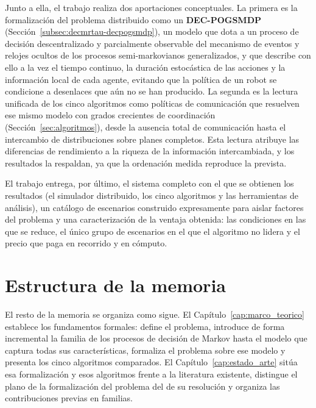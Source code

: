 Junto a ella, el trabajo realiza dos aportaciones conceptuales. La primera es la formalización del problema distribuido como un \textbf{DEC-POGSMDP} (Sección~\ref{subsec:decmrtau-decpogsmdp}), un modelo que dota a un proceso de decisión descentralizado y parcialmente observable del mecanismo de eventos y relojes ocultos de los procesos semi-markovianos generalizados, y que describe con ello a la vez el tiempo continuo, la duración estocástica de las acciones y la información local de cada agente, evitando que la política de un robot se condicione a desenlaces que aún no se han producido. La segunda es la lectura unificada de los cinco algoritmos como políticas de comunicación que resuelven ese mismo modelo con grados crecientes de coordinación (Sección~\ref{sec:algoritmos}), desde la ausencia total de comunicación hasta el intercambio de distribuciones sobre planes completos. Esta lectura atribuye las diferencias de rendimiento a la riqueza de la información intercambiada, y los resultados la respaldan, ya que la ordenación medida reproduce la prevista.

El trabajo entrega, por último, el sistema completo con el que se obtienen los resultados (el simulador distribuido, los cinco algoritmos y las herramientas de análisis), un catálogo de escenarios construido expresamente para aislar factores del problema y una caracterización de la ventaja obtenida: las condiciones en las que se reduce, el único grupo de escenarios en el que el algoritmo no lidera y el precio que paga en recorrido y en cómputo.

\section{Estructura de la memoria} \label{sec:intro-estructura}

El resto de la memoria se organiza como sigue. El Capítulo~\ref{cap:marco_teorico} establece los fundamentos formales: define el problema, introduce de forma incremental la familia de los procesos de decisión de Markov hasta el modelo que captura todas sus características, formaliza el problema sobre ese modelo y presenta los cinco algoritmos comparados. El Capítulo~\ref{cap:estado_arte} sitúa esa formalización y esos algoritmos frente a la literatura existente, distingue el plano de la formalización del problema del de su resolución y organiza las contribuciones previas en familias.

